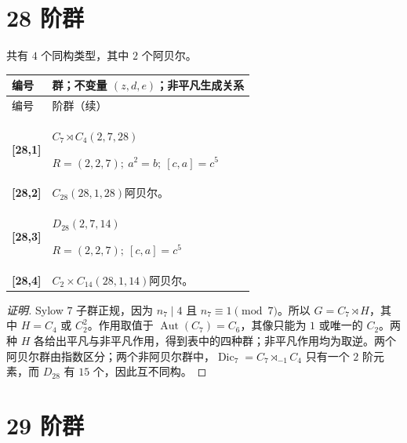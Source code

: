 \documentclass[UTF8,fontset=fandol,11pt,a4paper]{ctexart}
\newcommand{\Aut}{\operatorname{Aut}}\newcommand{\GL}{\operatorname{GL}}\newcommand{\ord}{\operatorname{ord}}\newcommand{\Z}{\mathrm Z}
\begin{document}
\section*{28 阶群}\label{order:28}

共有 $4$ 个同构类型，其中 $2$ 个阿贝尔。

\begingroup\small\setlength{\tabcolsep}{3pt}\renewcommand{\arraystretch}{1.12}

\begin{longtable}{@{}p{17mm}>{\raggedright\arraybackslash}p{141mm}@{}}

\toprule 编号 & 群；不变量 $(z,d,e)$；非平凡生成关系\\\midrule\endfirsthead

\toprule 编号 & 28 阶群（续）\\\midrule\endhead\bottomrule\endfoot

\textbf{[28,1]} & $C_{7}\rtimes C_{4}$\quad $(2,7,28)$\par\(R=(2,2,7);\allowbreak\ a^{2}=b;\allowbreak\ [c,a]=c^{5}\)\\[3pt]

\textbf{[28,2]} & $C_{28}$\quad $(28,1,28)$\quad 阿贝尔。\\[3pt]

\textbf{[28,3]} & $D_{28}$\quad $(2,7,14)$\par\(R=(2,2,7);\allowbreak\ [c,a]=c^{5}\)\\[3pt]

\textbf{[28,4]} & $C_{2}\times C_{14}$\quad $(28,1,14)$\quad 阿贝尔。\\[3pt]

\end{longtable}\endgroup

\begin{proof}[证明]
Sylow $7$ 子群正规，因为 $n_7\mid4$ 且 $n_7\equiv1\pmod7$。所以 $G=C_7\rtimes H$，其中 $H=C_4$ 或 $C_2^2$。作用取值于 $\Aut(C_7)=C_6$，其像只能为 $1$ 或唯一的 $C_2$。两种 $H$ 各给出平凡与非平凡作用，得到表中的四种群；非平凡作用均为取逆。两个阿贝尔群由指数区分；两个非阿贝尔群中，$\operatorname{Dic}_7=C_7\rtimes_{-1}C_4$ 只有一个 $2$ 阶元素，而 $D_{28}$ 有 $15$ 个，因此互不同构。
\end{proof}

\section*{29 阶群}\label{order:29}
\end{document}
